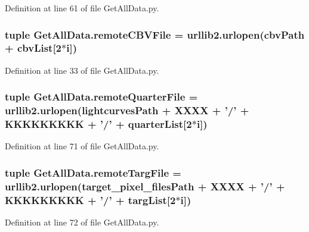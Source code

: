 Definition at line 61 of file Get\-All\-Data.\-py.

\hypertarget{namespace_get_all_data_a59840d46d0e238ee525782c0fbe13eeb}{
\subsubsection[{remote\-C\-B\-V\-File}]{\setlength{\rightskip}{0pt plus 5cm}tuple Get\-All\-Data.\-remote\-C\-B\-V\-File = urllib2.\-urlopen({\bf cbv\-Path} + {\bf cbv\-List}\mbox{[}2$\ast$i\mbox{]})}}\label{namespace_get_all_data_a59840d46d0e238ee525782c0fbe13eeb}


Definition at line 33 of file Get\-All\-Data.\-py.

\hypertarget{namespace_get_all_data_af072517ff6c21d5eab5ab2b237b0baf6}{
\subsubsection[{remote\-Quarter\-File}]{\setlength{\rightskip}{0pt plus 5cm}tuple Get\-All\-Data.\-remote\-Quarter\-File = urllib2.\-urlopen({\bf lightcurves\-Path} + {\bf X\-X\-X\-X} + '/' + {\bf K\-K\-K\-K\-K\-K\-K\-K\-K} + '/' + {\bf quarter\-List}\mbox{[}2$\ast$i\mbox{]})}}\label{namespace_get_all_data_af072517ff6c21d5eab5ab2b237b0baf6}


Definition at line 71 of file Get\-All\-Data.\-py.

\hypertarget{namespace_get_all_data_a7b84aca19fc066108a7f1216a37d8bc2}{
\subsubsection[{remote\-Targ\-File}]{\setlength{\rightskip}{0pt plus 5cm}tuple Get\-All\-Data.\-remote\-Targ\-File = urllib2.\-urlopen({\bf target\-\_\-pixel\-\_\-files\-Path} + {\bf X\-X\-X\-X} + '/' + {\bf K\-K\-K\-K\-K\-K\-K\-K\-K} + '/' + {\bf targ\-List}\mbox{[}2$\ast$i\mbox{]})}}\label{namespace_get_all_data_a7b84aca19fc066108a7f1216a37d8bc2}


Definition at line 72 of file Get\-All\-Data.\-py.

